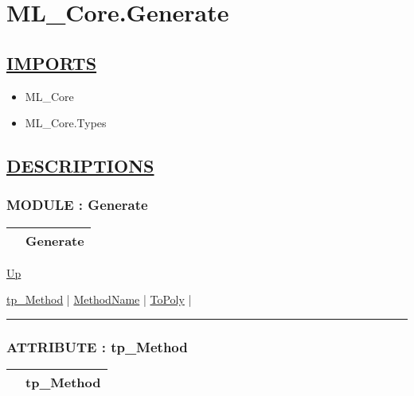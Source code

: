 \chapter*{ML\_Core.Generate}
\hypertarget{ecldoc:toc:ML_Core.Generate}{}

\section*{\underline{IMPORTS}}
\begin{itemize}
\item ML\_Core
\item ML\_Core.Types
\end{itemize}

\section*{\underline{DESCRIPTIONS}}
\subsection*{MODULE : Generate}
\hypertarget{ecldoc:ML_Core.Generate}{}

{\renewcommand{\arraystretch}{1.5}
\begin{tabularx}{\textwidth}{|>{\raggedright\arraybackslash}l|X|}
\hline
\hspace{0pt} & Generate \\
\hline
\end{tabularx}
}

\hyperlink{ecldoc:toc:ML_Core}{Up}

\par


\hyperlink{ecldoc:ecldoc-tp_Method}{tp\_Method}  |
\hyperlink{ecldoc:ml_core.generate.methodname}{MethodName}  |
\hyperlink{ecldoc:ml_core.generate.topoly}{ToPoly}  |

\rule{\textwidth}{0.4pt}

\subsection*{ATTRIBUTE : tp\_Method}
\hypertarget{ecldoc:ecldoc-tp_Method}{}

{\renewcommand{\arraystretch}{1.5}
\begin{tabularx}{\textwidth}{|>{\raggedright\arraybackslash}l|X|}
\hline
\hspace{0pt} & tp\_Method \\
\hline
\end{tabularx}
}

